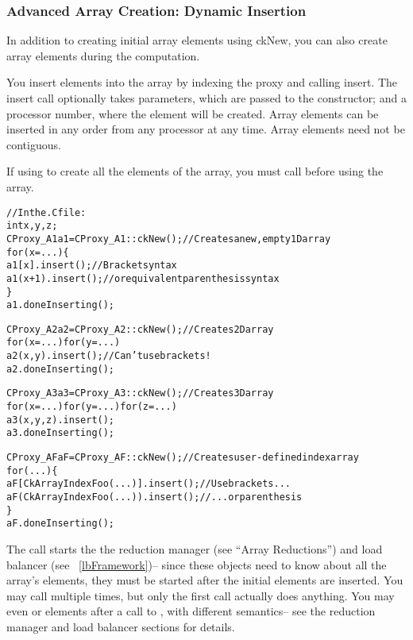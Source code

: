 \subsubsection{Advanced Array Creation: Dynamic Insertion}

In addition to creating initial array elements using ckNew,
you can also
create array elements during the computation.

You insert elements into the array by indexing the proxy
and calling insert.  The insert call optionally takes 
parameters, which are passed to the constructor; and a
processor number, where the element will be created.
Array elements can be inserted in any order from 
any processor at any time.  Array elements need not 
be contiguous.

If using  to create all the elements of the array,
you must call  before using
the array.

\begin{alltt}
//In the .C file:
int x,y,z;
CProxy_A1 a1=CProxy_A1::ckNew();  //Creates a new, empty 1D array
for (x=...) \{
   a1[x  ].insert();  //Bracket syntax
   a1(x+1).insert();  // or equivalent parenthesis syntax
\}
a1.doneInserting();

CProxy_A2 a2=CProxy_A2::ckNew();   //Creates 2D array
for (x=...) for (y=...)
   a2(x,y).insert();  //Can't use brackets!
a2.doneInserting();

CProxy_A3 a3=CProxy_A3::ckNew();   //Creates 3D array
for (x=...) for (y=...) for (z=...)
   a3(x,y,z).insert();
a3.doneInserting();

CProxy_AF aF=CProxy_AF::ckNew();   //Creates user-defined index array
for (...) \{
   aF[CkArrayIndexFoo(...)].insert(); //Use brackets...
   aF(CkArrayIndexFoo(...)).insert(); //  ...or parenthesis
\}
aF.doneInserting();

\end{alltt}

The  call starts the the reduction manager (see ``Array
Reductions'') and load balancer (see ~\ref{lbFramework})-- since
these objects need to know about all the array's elements, they
must be started after the initial elements are inserted.
You may call  multiple times, but only the first
call actually does anything.  You may even  or 
elements after a call to , with different semantics-- 
see the reduction manager and load balancer sections for details.

